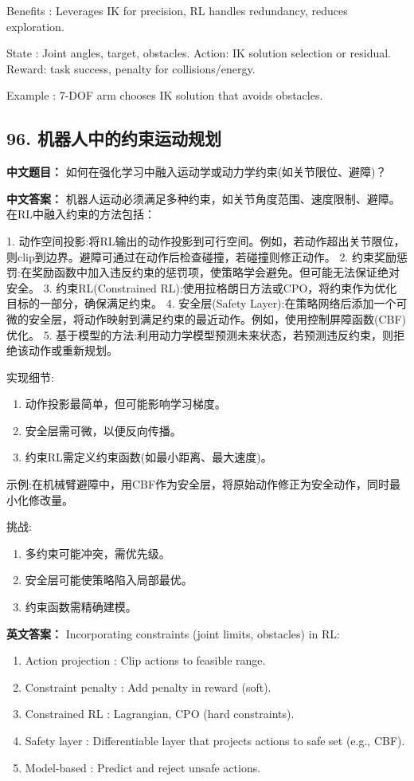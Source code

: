 \documentclass[10pt,a4paper]{ctexart}
\begin{document}
 Benefits : Leverages IK for precision, RL handles redundancy, reduces exploration.

 State : Joint angles, target, obstacles. Action: IK solution selection or residual. Reward: task success, penalty for collisions/energy.

 Example : 7-DOF arm chooses IK solution that avoids obstacles.

\subsection*{96. 机器人中的约束运动规划}
\textbf{中文题目：} 如何在强化学习中融入运动学或动力学约束(如关节限位、避障)？

\textbf{中文答案：}  
机器人运动必须满足多种约束，如关节角度范围、速度限制、避障。在RL中融入约束的方法包括：

1.  动作空间投影:将RL输出的动作投影到可行空间。例如，若动作超出关节限位，则clip到边界。避障可通过在动作后检查碰撞，若碰撞则修正动作。
2.  约束奖励惩罚:在奖励函数中加入违反约束的惩罚项，使策略学会避免。但可能无法保证绝对安全。
3.  约束RL(Constrained RL):使用拉格朗日方法或CPO，将约束作为优化目标的一部分，确保满足约束。
4.  安全层(Safety Layer):在策略网络后添加一个可微的安全层，将动作映射到满足约束的最近动作。例如，使用控制屏障函数(CBF)优化。
5.  基于模型的方法:利用动力学模型预测未来状态，若预测违反约束，则拒绝该动作或重新规划。

 实现细节:
\begin{enumerate}
    \item 动作投影最简单，但可能影响学习梯度。
    \item 安全层需可微，以便反向传播。
    \item 约束RL需定义约束函数(如最小距离、最大速度)。
\end{enumerate}

 示例:在机械臂避障中，用CBF作为安全层，将原始动作修正为安全动作，同时最小化修改量。

 挑战:
\begin{enumerate}
    \item 多约束可能冲突，需优先级。
    \item 安全层可能使策略陷入局部最优。
    \item 约束函数需精确建模。
\end{enumerate}

\textbf{英文答案：}  
Incorporating constraints (joint limits, obstacles) in RL:

\begin{enumerate}
    \item Action projection : Clip actions to feasible range.
    \item Constraint penalty : Add penalty in reward (soft).
    \item Constrained RL : Lagrangian, CPO (hard constraints).
    \item Safety layer : Differentiable layer that projects actions to safe set (e.g., CBF).
    \item Model-based : Predict and reject unsafe actions.
\end{enumerate}
\end{document}
